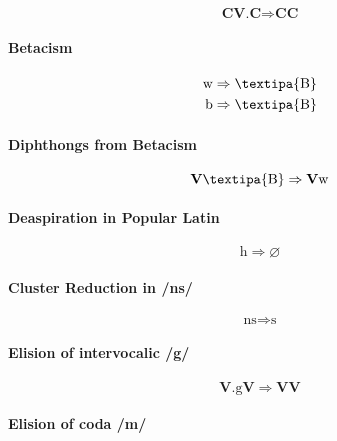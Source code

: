\documentclass{report}
\begin{document}
\begin{equation}
  \textbf{CV.C} \Rightarrow \textbf{CC}
\end{equation}

\paragraph{Betacism}

\begin{align}
\text{w} & \Rightarrow \text{\textipa{B}} \\
\text{b} & \Rightarrow \text{\textipa{B}}
\end{align}

\paragraph{Diphthongs from Betacism}

\begin{equation}
\textbf{V}\text{\textipa{B}} \Rightarrow \textbf{V}\text{w}
\end{equation}

\paragraph{Deaspiration in Popular Latin}

\begin{equation}
  \text{h} \Rightarrow \varnothing
\end{equation}

\paragraph{Cluster Reduction in /ns/}

\begin{equation}
  \text{ns} \Rightarrow \text{s}
\end{equation}

\paragraph{Elision of intervocalic /g/}

\begin{equation}
  \textbf{V}.\text{g}\textbf{V} \Rightarrow \textbf{VV}
\end{equation}

\paragraph{Elision of coda /m/}
\end{document}
